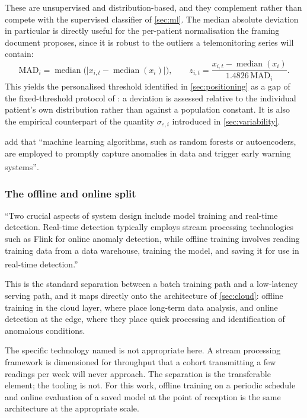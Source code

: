 \documentclass[12pt,a4paper,oneside]{report}
\newcommand{\bq}[1]{``#1''\textsuperscript{\dag}}
\begin{document}
These are unsupervised and distribution-based, and they complement rather than compete with the supervised classifier of \cref{sec:ml}. The median absolute deviation in particular is directly useful for the per-patient normalisation the framing document proposes, since it is robust to the outliers a telemonitoring series will contain:
\begin{equation}
  \mathrm{MAD}_i = \operatorname{median}\bigl(\lvert x_{i,t} - \operatorname{median}(x_i)\rvert\bigr),
  \qquad
  z_{i,t} = \frac{x_{i,t} - \operatorname{median}(x_i)}{1.4826\,\mathrm{MAD}_i}.
\end{equation}
This yields the personalised threshold identified in \cref{sec:positioning} as a gap of the fixed-threshold protocol of \textcite{mihevc2025}: a deviation is assessed relative to the individual patient's own distribution rather than against a population constant. It is also the empirical counterpart of the quantity $\sigma_{\varepsilon,i}$ introduced in \cref{sec:variability}.

\Textcite{liu2025review} add that \bq{machine learning algorithms, such as random forests or autoencoders, are employed to promptly capture anomalies in data and trigger early warning systems}.

\subsubsection{The offline and online split}

\bq{Two crucial aspects of system design include model training and real-time detection. Real-time detection typically employs stream processing technologies such as Flink for online anomaly detection, while offline training involves reading training data from a data warehouse, training the model, and saving it for use in real-time detection.}

This is the standard separation between a batch training path and a low-latency serving path, and it maps directly onto the architecture of \cref{sec:cloud}: offline training in the cloud layer, where \textcite{mucchi2021} place long-term data analysis, and online detection at the edge, where they place quick processing and identification of anomalous conditions.

The specific technology named is not appropriate here. A stream processing framework is dimensioned for throughput that a cohort transmitting a few readings per week will never approach. The separation is the transferable element; the tooling is not. For this work, offline training on a periodic schedule and online evaluation of a saved model at the point of reception is the same architecture at the appropriate scale.
\end{document}
